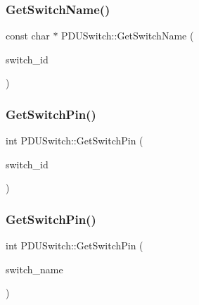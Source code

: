 \subsubsection{\texorpdfstring{Get\+Switch\+Name()}{GetSwitchName()}}
{\footnotesize\ttfamily const char $\ast$ P\+D\+U\+Switch\+::\+Get\+Switch\+Name (\begin{DoxyParamCaption}\item[{\hyperlink{namespacecubesat_a4343cdc3d5f03bad7a16bac6c47cd1ca}{Switch\+ID}}]{switch\+\_\+id }\end{DoxyParamCaption})\hspace{0.3cm}{\ttfamily [static]}}

\mbox{\label{classcubesat_1_1PDUSwitch_a9f3774f4d48d228b066cf441e342661b}} 
\subsubsection{\texorpdfstring{Get\+Switch\+Pin()}{GetSwitchPin()}\hspace{0.1cm}{\footnotesize\ttfamily [1/2]}}
{\footnotesize\ttfamily int P\+D\+U\+Switch\+::\+Get\+Switch\+Pin (\begin{DoxyParamCaption}\item[{\hyperlink{namespacecubesat_a4343cdc3d5f03bad7a16bac6c47cd1ca}{Switch\+ID}}]{switch\+\_\+id }\end{DoxyParamCaption})\hspace{0.3cm}{\ttfamily [static]}}

\mbox{\label{classcubesat_1_1PDUSwitch_a8ea76538610e321324eff6bcab2d9ce2}} 
\subsubsection{\texorpdfstring{Get\+Switch\+Pin()}{GetSwitchPin()}\hspace{0.1cm}{\footnotesize\ttfamily [2/2]}}
{\footnotesize\ttfamily int P\+D\+U\+Switch\+::\+Get\+Switch\+Pin (\begin{DoxyParamCaption}\item[{const char $\ast$}]{switch\+\_\+name }\end{DoxyParamCaption})\hspace{0.3cm}{\ttfamily [static]}}

